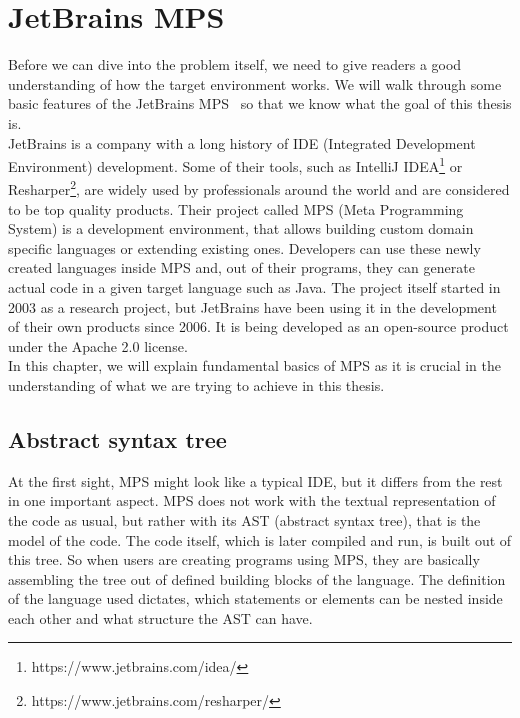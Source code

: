 \chapter{JetBrains MPS}
\label{chap:jetbrains_mps}

Before we can dive into the problem itself, we need to give readers a good understanding of how the target environment works.
We will walk through some basic features of the JetBrains MPS~\cite{MPS} so that we know what the goal of this thesis is.
\\

JetBrains is a company with a long history of IDE (Integrated Development Environment) development.
Some of their tools, such as IntelliJ IDEA\footnote{https://www.jetbrains.com/idea/} or Resharper\footnote{https://www.jetbrains.com/resharper/}, are widely used by professionals around the world and are considered to be top quality products.
Their project called MPS (Meta Programming System) is a development environment, that allows building custom domain specific languages or extending existing ones.
Developers can use these newly created languages inside MPS and, out of their programs, they can generate actual code in a given target language such as Java.
The project itself started in 2003 as a research project, but JetBrains have been using it in the development of their own products since 2006.
It is being developed as an open-source product under the Apache 2.0 license.
\\

In this chapter, we will explain fundamental basics of MPS as it is crucial in the understanding of what we are trying to achieve in this thesis.

\section{Abstract syntax tree}
At the first sight, MPS might look like a typical IDE, but it differs from the rest in one important aspect.
MPS does not work with the textual representation of the code as usual, but rather with its AST (abstract syntax tree), that is the model of the code.
The code itself, which is later compiled and run, is built out of this tree.
So when users are creating programs using MPS, they are basically assembling the tree out of defined building blocks of the language.
The definition of the language used dictates, which statements or elements can be nested inside each other and what structure the AST can have.
\\

